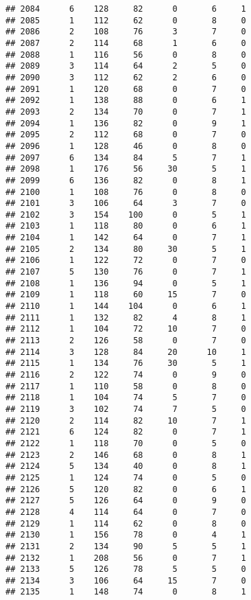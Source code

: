 \documentclass[
]{article}
\begin{document}
\begin{verbatim}
## 2084      6    128     82      0       6     1
## 2085      1    112     62      0       8     0
## 2086      2    108     76      3       7     0
## 2087      2    114     68      1       6     0
## 2088      1    116     56      0       8     0
## 2089      3    114     64      2       5     0
## 2090      3    112     62      2       6     0
## 2091      1    120     68      0       7     0
## 2092      1    138     88      0       6     1
## 2093      2    134     70      0       7     1
## 2094      1    136     82      0       9     1
## 2095      2    112     68      0       7     0
## 2096      1    128     46      0       8     0
## 2097      6    134     84      5       7     1
## 2098      1    176     56     30       5     1
## 2099      6    136     82      0       8     1
## 2100      1    108     76      0       8     0
## 2101      3    106     64      3       7     0
## 2102      3    154    100      0       5     1
## 2103      1    118     80      0       6     1
## 2104      1    142     64      0       7     1
## 2105      2    134     80     30       5     1
## 2106      1    122     72      0       7     0
## 2107      5    130     76      0       7     1
## 2108      1    136     94      0       5     1
## 2109      1    118     60     15       7     0
## 2110      1    144    104      0       6     1
## 2111      1    132     82      4       8     1
## 2112      1    104     72     10       7     0
## 2113      2    126     58      0       7     0
## 2114      3    128     84     20      10     1
## 2115      1    134     76     30       5     1
## 2116      2    122     74      0       9     0
## 2117      1    110     58      0       8     0
## 2118      1    104     74      5       7     0
## 2119      3    102     74      7       5     0
## 2120      2    114     82     10       7     1
## 2121      6    124     82      0       7     1
## 2122      1    118     70      0       5     0
## 2123      2    146     68      0       8     1
## 2124      5    134     40      0       8     1
## 2125      1    124     74      0       5     0
## 2126      5    120     82      0       6     1
## 2127      5    126     64      0       9     0
## 2128      4    114     64      0       7     0
## 2129      1    114     62      0       8     0
## 2130      1    156     78      0       4     1
## 2131      2    134     90      5       5     1
## 2132      1    208     56      0       7     1
## 2133      5    126     78      5       5     0
## 2134      3    106     64     15       7     0
## 2135      1    148     74      0       8     1

\end{verbatim}
\end{document}
